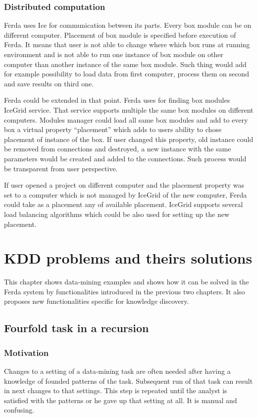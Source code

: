 \documentclass[a4paper,12pt]{book}
\begin{document}
\subsection{Distributed computation}
Ferda uses Ice for communication between its parts. Every box module can be on different computer. Placement of box module is specified before execution of Ferda. It means that user is not able to change where which box runs at running environment and is not able to run one instance of box module on other computer than another instance of the same box module. Such thing would add for example possibility to load data from first computer, process them on second and save results on third one. 

Ferda could be extended in that point. Ferda uses for finding box modules IceGrid service. That service supports multiple the same box modules on different computers. Modules manager could load all same box modules and add to every box a virtual property ``placement'' which adds to users ability to chose placement of instance of the box. If user changed this property, old instance could be removed from connections and destroyed, a new instance with the same parameters would be created and added to the connections. Such process would be transparent from user perspective.

If user opened a project on different computer and the placement property was set to a computer which is not managed by IceGrid of the new computer, Ferda could take as a placement any of available placement. IceGrid supports several load balancing algorithms which could be also used for setting up the new placement.

\chapter{KDD problems and theirs solutions}
\label{chap:KDDExamples}
This chapter shows data-mining examples and shows how it can be solved in the Ferda system by functionalities introduced in the previous two chapters. It also proposes new functionalities specific for knowledge discovery.

\section{Fourfold task in a recursion}
\subsection{Motivation}
Changes to a setting of a data-mining task are often needed after having a knowledge of founded patterns of the task. Subsequent run of that task can result in next changes to that settings. This step is repeated until the analyst is satisfied with the patterns or he gave up that setting at all. It is manual and confusing.
\end{document}
